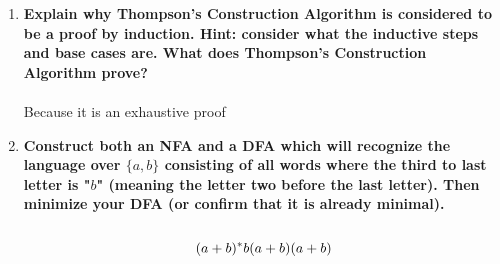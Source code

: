 \begin{enumerate}
\begin{itemize}
\end{itemize}


\newpage
\item \textbf{Explain why Thompson's Construction Algorithm is considered to be a proof by induction. Hint: consider what the inductive steps and base cases are. What does Thompson's Construction Algorithm prove?}
\\\\
Because it is an exhaustive proof

\newpage
\item \textbf{Construct both an NFA and a DFA which will recognize the language over $\{a,b\}$ consisting of all words where the third to last letter is "$b$" (meaning the letter two before the last letter). Then minimize your DFA (or confirm that it is already minimal).}
\\\\
$$(a + b) {}^\ast b (a + b) (a + b)$$

\end{enumerate}


